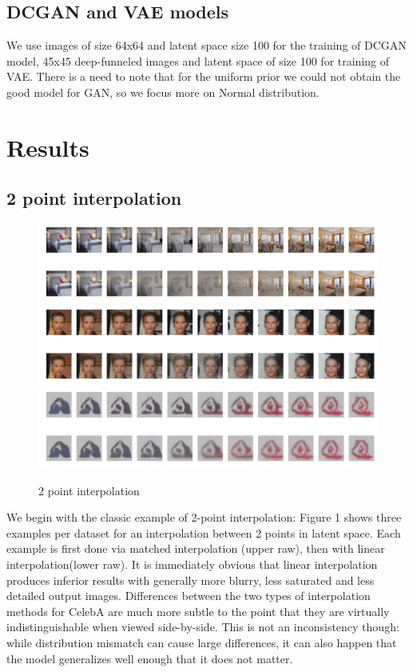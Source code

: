 \documentclass{article}
\begin{document}
\subsection{DCGAN and VAE models}
We use images of size 64x64 and latent space size 100 for the training of DCGAN model, 45x45 deep-funneled images and latent space of size 100 for training of VAE. There is a need to note that for the uniform prior we could not obtain the good model for GAN, so we focus more on Normal distribution.

\section{Results}
\subsection{2 point interpolation}

\begin{center}
\begin{figure}
    \includegraphics[width=\linewidth]{CelebA/images/LSUN_int2_2.png}
    \includegraphics[width=\linewidth]{CelebA/images/CelebA_int2_5.png}
    \includegraphics[width=\linewidth]{CelebA/images/LLD_int2_3.png}
    \caption{2 point interpolation}
\end{figure}
\end{center}
We begin with the classic example of 2-point interpolation: Figure 1 shows
three examples per dataset for an interpolation between 2 points in latent space. Each example is first done via matched interpolation (upper raw), then with linear interpolation(lower raw). It is immediately obvious that linear interpolation produces inferior results with generally more blurry, less saturated and less detailed output images. Differences between the two types of interpolation methods for CelebA are much more subtle to the point that they are virtually indistinguishable when viewed side-by-side. This is not an inconsistency though: while distribution mismatch can cause large differences, it can also happen that the model generalizes well enough that it does not matter.
\end{document}
